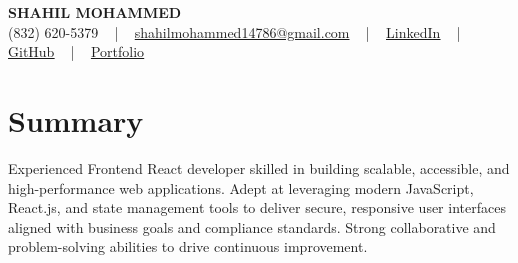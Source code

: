\documentclass[letterpaper,10pt]{article}
\begin{document}
\begin{center}
    {\fontsize{14pt}{12pt}\selectfont \textbf{\MakeUppercase{Shahil Mohammed}}}\\ \vspace{2pt}
    \fontsize{10pt}{12pt}\selectfont (832) 620-5379 ~ | ~ \href{mailto:shahilmohammed14786@gmail.com}{shahilmohammed14786@gmail.com} ~ | ~  
    \href{https://www.linkedin.com/in/shahil-mohammed-9652931a1/}{\color{blue}\underline{LinkedIn}}  ~ | ~ 
    \href{https://github.com/freakbeast14}{\color{blue}\underline{GitHub}} ~ | ~ 
    \href{https://shahil-mohammed.netlify.app/}{\color{blue}\underline{Portfolio}}
    \vspace{-8pt}
\end{center}

\section{Summary}
\vspace{-2pt}\fontsize{8pt}{9pt}\selectfont
Experienced Frontend React developer skilled in building scalable, accessible, and high-performance web applications. Adept at leveraging modern JavaScript, React.js, and state management tools to deliver secure, responsive user interfaces aligned with business goals and compliance standards. Strong collaborative and problem-solving abilities to drive continuous improvement.
 \vspace{-5pt}
 
\vspace{-2pt}
\end{document}
